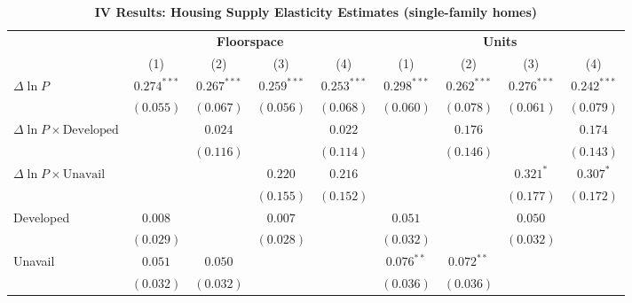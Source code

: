 
\begin{table}[H]
\caption{\textbf{IV Results: Housing Supply Elasticity Estimates (single-family homes)}}
\begin{center}
\begin{footnotesize}
\begin{threeparttable}
\begin{tabular}{l@{} c@{} c@{} c@{} c@{} c@{} c@{} c@{} c@{}}
\toprule
 & \multicolumn{4}{c}{\textbf{Floorspace}} & \multicolumn{4}{c}{\textbf{Units}} \\
\cmidrule(lr){2-5} \cmidrule(lr){6-9}
 & (1) & (2) & (3) & (4) & (1) & (2) & (3) & (4) \\
\midrule
$\Delta\ln P$                         & $0.274^{***}$ & $0.267^{***}$ & $0.259^{***}$ & $0.253^{***}$ & $0.298^{***}$ & $0.262^{***}$ & $0.276^{***}$ & $0.242^{***}$ \\
                                      & $(0.055)$     & $(0.067)$     & $(0.056)$     & $(0.068)$     & $(0.060)$     & $(0.078)$     & $(0.061)$     & $(0.079)$     \\
$\Delta\ln P\times{\text{Developed}}$ &               & $0.024$       &               & $0.022$       &               & $0.176$       &               & $0.174$       \\
                                      &               & $(0.116)$     &               & $(0.114)$     &               & $(0.146)$     &               & $(0.143)$     \\
$\Delta\ln P\times{\text{Unavail}}$   &               &               & $0.220$       & $0.216$       &               &               & $0.321^{*}$   & $0.307^{*}$   \\
                                      &               &               & $(0.155)$     & $(0.152)$     &               &               & $(0.177)$     & $(0.172)$     \\
Developed                             & $0.008$       &               & $0.007$       &               & $0.051$       &               & $0.050$       &               \\
                                      & $(0.029)$     &               & $(0.028)$     &               & $(0.032)$     &               & $(0.032)$     &               \\
Unavail                               & $0.051$       & $0.050$       &               &               & $0.076^{**}$  & $0.072^{**}$  &               &               \\
                                      & $(0.032)$     & $(0.032)$     &               &               & $(0.036)$     & $(0.036)$     &               &               \\

\end{tabular}
\end{threeparttable}
\end{footnotesize}
\end{center}
\end{table}
